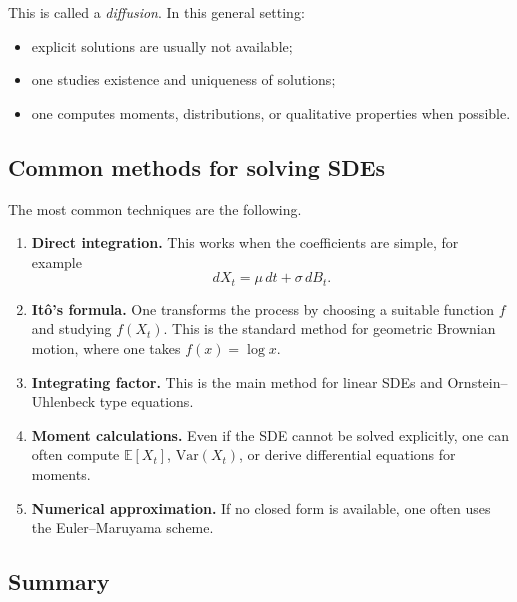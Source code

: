 \documentclass[11pt]{article}
\theoremstyle{definition}
\begin{document}
This is called a \emph{diffusion}. In this general setting:
\begin{itemize}[leftmargin=2em]
    \item explicit solutions are usually not available;
    \item one studies existence and uniqueness of solutions;
    \item one computes moments, distributions, or qualitative properties when possible.
\end{itemize}

\subsection{Common methods for solving SDEs}

The most common techniques are the following.

\begin{enumerate}[leftmargin=2em]
    \item \textbf{Direct integration.}  
    This works when the coefficients are simple, for example
    \[
    dX_t=\mu\,dt+\sigma\,dB_t.
    \]

    \item \textbf{It\^o's formula.}  
    One transforms the process by choosing a suitable function \(f\) and studying \(f(X_t)\).  
    This is the standard method for geometric Brownian motion, where one takes \(f(x)=\log x\).

    \item \textbf{Integrating factor.}  
    This is the main method for linear SDEs and Ornstein--Uhlenbeck type equations.

    \item \textbf{Moment calculations.}  
    Even if the SDE cannot be solved explicitly, one can often compute \(\mathbb E[X_t]\), \(\mathrm{Var}(X_t)\), or derive differential equations for moments.

    \item \textbf{Numerical approximation.}  
    If no closed form is available, one often uses the Euler--Maruyama scheme.
\end{enumerate}

\subsection{Summary}
\end{document}
